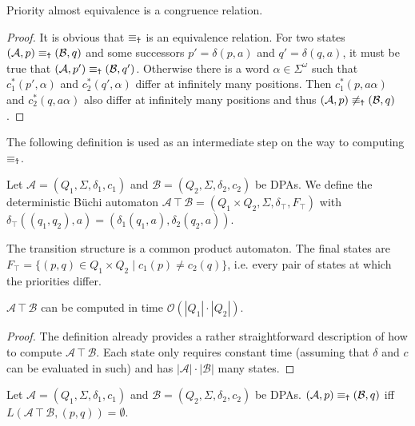 \begin{lem}
	Priority almost equivalence is a congruence relation.
	\label{lem:general:Ankh_congruence}
\end{lem}

\begin{proof} 
	It is obvious that $\equiv_\text{\Ankh}$ is an equivalence relation. For two states $(\mathcal{A}, p) \equiv_\text{\Ankh} (\mathcal{B}, q)$ and some successors $p' = \delta(p, a)$ and $q' = \delta(q, a)$, it must be true that $(\mathcal{A}, p') \equiv_\text{\Ankh} (\mathcal{B}, q')$. Otherwise there is a word $\alpha \in \Sigma^\omega$ such that $c_1^*(p', \alpha)$ and $c_2^*(q', \alpha)$ differ at infinitely many positions. Then $c_1^*(p, a \alpha)$ and $c_2^*(q, a \alpha)$ also differ at infinitely many positions and thus $(\mathcal{A}, p) \not\equiv_\text{\Ankh} (\mathcal{B}, q)$.
\end{proof}

The following definition is used as an intermediate step on the way to computing $\equiv_\text{\Ankh}$.

\begin{defn}
	Let $\mathcal{A} = (Q_1, \Sigma, \delta_1, c_1)$ and $\mathcal{B} = (Q_2, \Sigma, \delta_2, c_2)$ be DPAs. We define the deterministic Büchi automaton $\mathcal{A} \intercal \mathcal{B} = (Q_1 \times Q_2, \Sigma, \delta_\intercal, F_\intercal)$ with $\delta_\intercal((q_1, q_2), a) = (\delta_1(q_1, a), \delta_2(q_2, a))$. 
	
	The transition structure is a common product automaton. The final states are $F_\intercal = \{ (p, q) \in Q_1 \times Q_2 \mid c_1(p) \neq c_2(q) \}$, i.e. every pair of states at which the priorities differ. 
\end{defn}

\begin{lem}
	$\mathcal{A} \intercal \mathcal{B}$ can be computed in time $\mathcal{O}(|Q_1| \cdot |Q_2|)$.
	\label{lem:general:intercal_runtime}
\end{lem}

\begin{proof}
	The definition already provides a rather straightforward description of how to compute $\mathcal{A} \intercal \mathcal{B}$. Each state only requires constant time (assuming that $\delta$ and $c$ can be evaluated in such) and has $|\mathcal{A}| \cdot |\mathcal{B}|$ many states.
\end{proof}

\begin{lem}
	Let $\mathcal{A} = (Q_1, \Sigma, \delta_1, c_1)$ and $\mathcal{B} = (Q_2, \Sigma, \delta_2, c_2)$ be DPAs. $(\mathcal{A}, p) \equiv_\text{\Ankh} (\mathcal{B}, q)$ iff $L(\mathcal{A} \intercal \mathcal{B}, (p, q)) = \emptyset$. 
	\label{lem:general:intercal_prioalmostequiv}
\end{lem}


